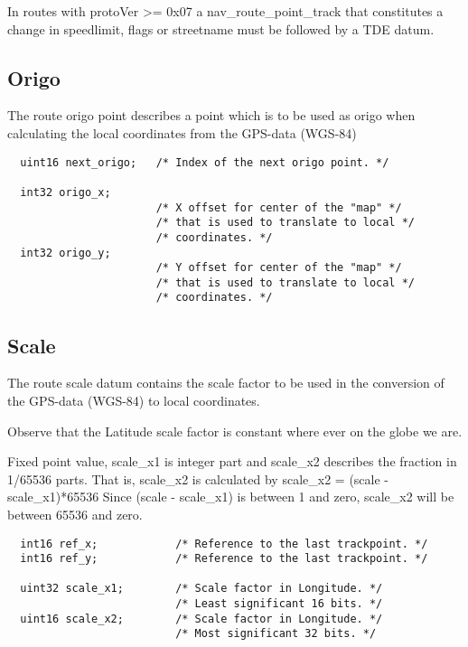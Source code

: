 \documentclass[a4paper]{article}
\begin{document}
In routes with protoVer >= 0x07 a nav\_route\_point\_track that 
constitutes a change in speedlimit, flags or streetname must
be followed by a TDE datum.

  
\subsection{Origo}

  The route origo point describes a point which is to be
  used as origo when calculating the local coordinates
  from the GPS-data (WGS-84)

\begin{verbatim}
  uint16 next_origo;   /* Index of the next origo point. */

  int32 origo_x;
                       /* X offset for center of the "map" */
                       /* that is used to translate to local */
                       /* coordinates. */
  int32 origo_y;
                       /* Y offset for center of the "map" */
                       /* that is used to translate to local */
                       /* coordinates. */
\end{verbatim}

\subsection{Scale}

  The route scale datum contains the scale factor to
  be used in the conversion of the GPS-data (WGS-84)
  to local coordinates.

  Observe that the Latitude scale factor is constant
  where ever on the globe we are.

  Fixed point value, scale\_x1 is integer part and
  scale\_x2 describes the fraction in 1/65536 parts.
  That is, scale\_x2 is calculated by
  scale\_x2 = (scale - scale\_x1)*65536
  Since (scale - scale\_x1) is between 1 and zero,
  scale\_x2 will be between 65536 and zero.


\begin{verbatim}
  int16 ref_x;            /* Reference to the last trackpoint. */
  int16 ref_y;            /* Reference to the last trackpoint. */

  uint32 scale_x1;        /* Scale factor in Longitude. */
                          /* Least significant 16 bits. */
  uint16 scale_x2;        /* Scale factor in Longitude. */
                          /* Most significant 32 bits. */
\end{verbatim}
\end{document}
